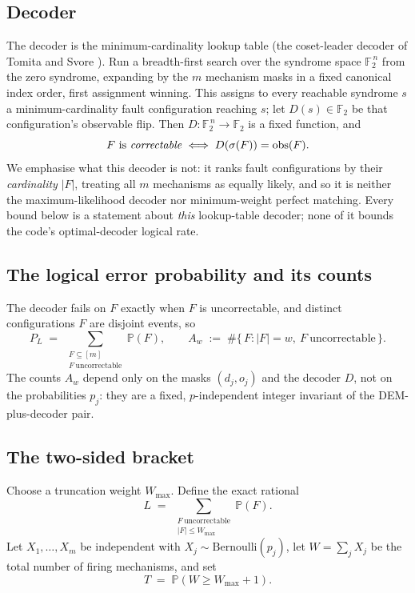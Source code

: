 \documentclass[11pt]{amsart}
\newcommand{\PL}{P_{L}}
\newcommand{\WMAX}{W_{\max}}
\newcommand{\sig}{\sigma}
\newcommand{\obs}{\mathrm{obs}}
\newcommand{\Prb}{\mathbb{P}}
\newcommand{\Zt}{\mathbb{F}_2}
\theoremstyle{plain}
\theoremstyle{definition}
\theoremstyle{remark}
\begin{document}
\subsection{Decoder}\label{ssec:decoder} The decoder is the minimum-cardinality
lookup table (the coset-leader decoder of Tomita and Svore \cite{TS}). Run a
breadth-first search over the syndrome space $\Zt^{\,n}$ from the zero syndrome,
expanding by the $m$ mechanism masks in a fixed canonical index order, first
assignment winning. This assigns to every reachable syndrome $s$ a
minimum-cardinality fault configuration reaching $s$; let $D(s)\in\Zt$ be that
configuration's observable flip. Then $D:\Zt^{\,n}\to\Zt$ is a fixed function,
and
\[
   F \text{ is \emph{correctable}} \iff D(\sig(F))=\obs(F).
\]
We emphasise what this decoder is not: it ranks fault configurations by their
\emph{cardinality} $|F|$, treating all $m$ mechanisms as equally likely, and so
it is neither the maximum-likelihood decoder nor minimum-weight perfect
matching. Every bound below is a statement about \emph{this} lookup-table
decoder; none of it bounds the code's optimal-decoder logical rate.

\subsection{The logical error probability and its counts} The decoder fails on
$F$ exactly when $F$ is uncorrectable, and distinct configurations $F$ are
disjoint events, so
\begin{equation}\label{eq:PLexact}
   \PL \;=\; \sum_{\substack{F\subseteq[m]\\ F\ \mathrm{uncorrectable}}}\Prb(F),
   \qquad
   A_w \;:=\; \#\{\,F : |F|=w,\ F\ \mathrm{uncorrectable}\,\}.
\end{equation}
The counts $A_w$ depend only on the masks $(d_j,o_j)$ and the decoder $D$, not
on the probabilities $p_j$: they are a fixed, $p$-independent integer invariant
of the DEM-plus-decoder pair.

\subsection{The two-sided bracket} Choose a truncation weight $\WMAX$. Define
the exact rational
\begin{equation}\label{eq:L}
   L \;=\; \sum_{\substack{F\ \mathrm{uncorrectable}\\ |F|\le \WMAX}}\Prb(F).
\end{equation}
Let $X_1,\dots,X_m$ be independent with $X_j\sim\mathrm{Bernoulli}(p_j)$, let
$W=\sum_j X_j$ be the total number of firing mechanisms, and set
\begin{equation}\label{eq:T}
   T \;=\; \Prb(W\ge \WMAX+1).
\end{equation}
\end{document}
